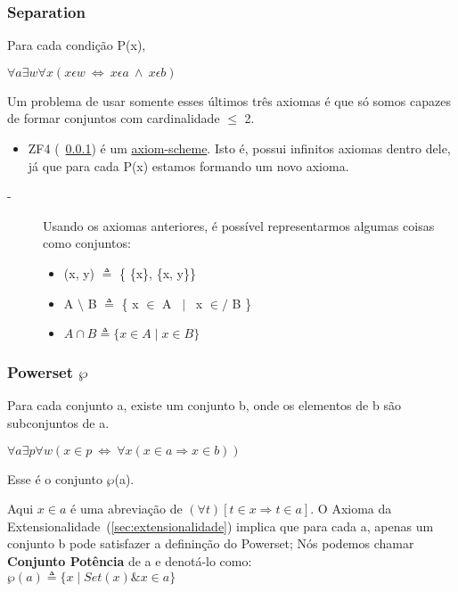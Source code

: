 \documentclass[12pt, a4paper]{article}
\begin{document}
			\subsubsection{Separation}
			\label{sec:separation}
				Para cada condi\c{c}\~ao P(x),\\
				\begin{center}
				$ \forall a \exists w \forall x (x \epsilon w ~ \Leftrightarrow ~ x \epsilon a ~\wedge~ x \epsilon b )$
				\end{center}
					
				Um problema de usar somente esses \'ultimos tr\^es axiomas \'e que s\'o somos capazes de formar
				conjuntos com cardinalidade $\leq$ 2.
					\begin{itemize}
					\item ZF4 (~\ref{sec:separation}) \'e um  \underline{axiom-scheme}. Isto \'e, possui infinitos axiomas dentro dele, j\'a que
					para cada P(x) estamos formando um novo axioma.
					\end{itemize} 	
			
			\begin{description}
			\item[-] Usando os axiomas anteriores, \'e poss\'ivel representarmos algumas coisas como conjuntos:
				\begin{itemize}
				\item (x, y) $\triangleq$ \{ \{x\}, \{x, y\}\}	\label{teste}
				\item A $\setminus$ B $\triangleq$ \{ x $\in$ A ~$\mid$~ x $\in\!\!\!\!\!/$ B \}
				\item $ A \cap B \triangleq \{ x \in A \mid x \in B \} $ 
				\end{itemize}
			\end{description}
			
			\subsubsection{Powerset $\wp$}
				Para cada conjunto a, existe um conjunto b, onde os elementos de b s\~ao subconjuntos de a.
				\begin{center}
				$\forall a \exists p \forall w ( x \in p ~ \Leftrightarrow ~ \forall x (x \in a \Rightarrow x \in b))$
				\end{center}

				Esse \'e o conjunto $\wp$(a).

				Aqui $x \in a$ \'e uma abrevia\c{c}\~ao de $(\forall t)[t \in x \Rightarrow t \in a]$. O Axioma da Extensionalidade~(\ref{sec:extensionalidade}) implica que para cada a, apenas um conjunto b pode satisfazer a definin\c{c}\~ao do Powerset; N\'os podemos chamar \textbf{Conjunto Pot\^encia} de a e denot\'a-lo como:\\
				$\wp(a) \triangleq \{x \mid Set(x) \& x \in a \}$\\
				
\end{document}
